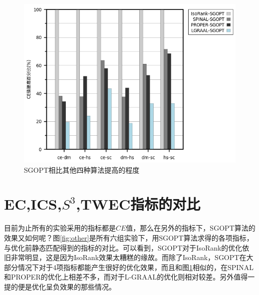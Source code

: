\begin{figure}[htbp]
\centering
\includegraphics[height=0.4\textheight]{pic/all_improve.png}
\caption{SGOPT相比其他四种算法提高的程度} 
\label{fig:all_improve}
\end{figure}

\section{EC,ICS,$S^3$,TWEC指标的对比}
目前为止所有的实验采用的指标都是$CE$值，那么在另外的指标下，SGOPT算法的效果又如何呢？图\ref{fig:other}是所有六组实验下，用SGOPT算法求得的各项指标，与优化前静态匹配得到的指标的对比。可以看到，SGOPT对于IsoRank的优化依旧非常明显，这是因为IsoRank效果太糟糕的缘故。而除了IsoRank，SGOPT在大部分情况下对于4项指标都能产生很好的优化效果，而且和图\ref{fig:all_improve}相似的，在SPINAL和PROPER的优化上相差不多，而对于L-GRAAL的优化则相对较差。另外值得一提的便是优化呈负效果的那些情况。

